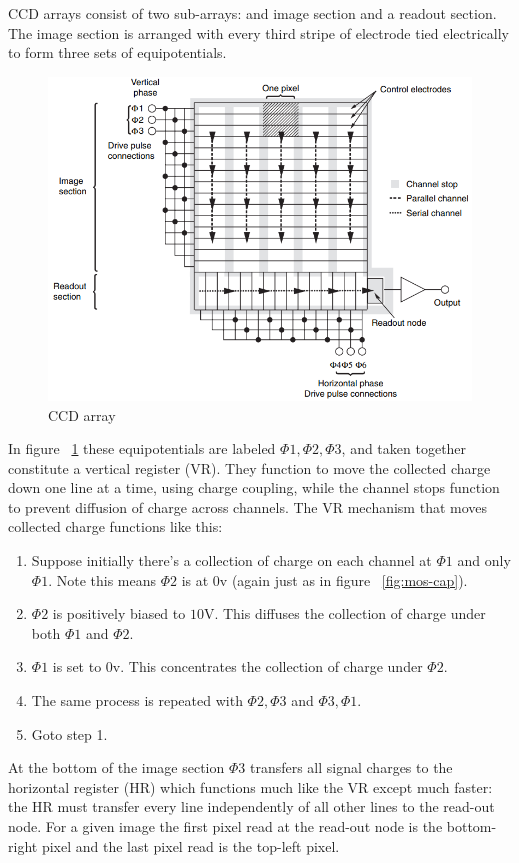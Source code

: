 CCD arrays consist of two sub-arrays: and image section and a readout section.
%
The image section is arranged with every third stripe of electrode tied electrically to form three sets of equipotentials.
\begin{figure}
    \includegraphics[width=\linewidth,keepaspectratio]{figures/ccd_array.png}
    \caption{CCD array\cite{pawley1995handbook}}
    \label{fig:ccd-array}
\end{figure}
%
In figure ~\ref{fig:ccd-array} these equipotentials are labeled $\Phi1, \Phi2, \Phi3$, and taken together constitute a vertical register (VR).
%
They function to move the collected charge down one line at a time, using charge coupling, while the channel stops function to prevent diffusion of charge across channels.
%
The VR mechanism that moves collected charge functions like this:
\begin{enumerate}
    \item Suppose initially there's a collection of charge on each channel at $\Phi1$ and only $\Phi1$. Note this means $\Phi2$ is at $0$v (again just as in figure ~\ref{fig:mos-cap}).
    \item $\Phi2$ is positively biased to $10$V. This diffuses the collection of charge under both $\Phi1$ and $\Phi2$.
    \item $\Phi1$ is set to $0$v. This concentrates the collection of charge under $\Phi2$.
    \item The same process is repeated with $\Phi2, \Phi3$ and $\Phi3, \Phi1$.
    \item Goto step 1.
\end{enumerate}
At the bottom of the image section $\Phi3$ transfers all signal charges to the horizontal register (HR) which functions much like the VR except much faster: the HR must transfer every line independently of all other lines to the read-out node. For a given image the first pixel read at the read-out node is the bottom-right pixel and the last pixel read is the top-left pixel.

